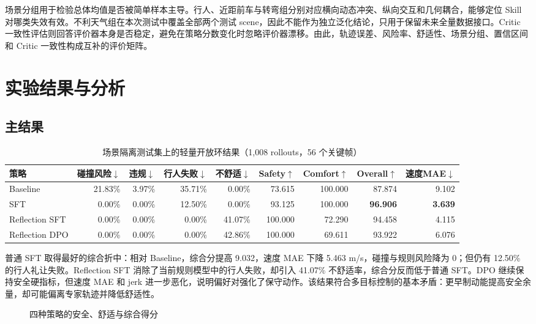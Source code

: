 \documentclass[UTF8,a4paper,12pt,fontset=fandol]{ctexart}
\begin{document}
场景分组用于检验总体均值是否被简单样本主导。行人、近距前车与转弯组分别对应横向动态冲突、纵向交互和几何耦合，能够定位 Skill 对哪类失效有效。不利天气组在本次测试中覆盖全部两个测试 scene，因此不能作为独立泛化结论，只用于保留未来全量数据接口。Critic 一致性评估则回答评价器本身是否稳定，避免在策略分数变化时忽略评价器漂移。由此，轨迹误差、风险率、舒适性、场景分组、置信区间和 Critic 一致性构成互补的评价矩阵。

\section{实验结果与分析}
\subsection{主结果}
\begin{table}[!htbp]
\centering\scriptsize
\caption{场景隔离测试集上的轻量开放环结果（1,008 rollouts，56 个关键帧）}
\begin{tabular}{lrrrrrrrr}
\toprule
策略 & 碰撞风险$\downarrow$ & 违规$\downarrow$ & 行人失败$\downarrow$ & 不舒适$\downarrow$ & Safety$\uparrow$ & Comfort$\uparrow$ & Overall$\uparrow$ & 速度MAE$\downarrow$ \\
\midrule
Baseline & 21.83\% & 3.97\% & 35.71\% & 0.00\% & 73.615 & 100.000 & 87.874 & 9.102 \\
SFT & 0.00\% & 0.00\% & 12.50\% & 0.00\% & 93.125 & 100.000 & \textbf{96.906} & \textbf{3.639} \\
Reflection SFT & 0.00\% & 0.00\% & 0.00\% & 41.07\% & 100.000 & 72.290 & 94.458 & 4.115 \\
Reflection DPO & 0.00\% & 0.00\% & 0.00\% & 42.86\% & 100.000 & 69.611 & 93.922 & 6.076 \\
\bottomrule
\end{tabular}
\end{table}

普通 SFT 取得最好的综合折中：相对 Baseline，综合分提高 9.032，速度 MAE 下降 5.463 m/s，碰撞与规则风险降为 0；但仍有 12.50\% 的行人礼让失败。Reflection SFT 消除了当前规则模型中的行人失败，却引入 41.07\% 不舒适率，综合分反而低于普通 SFT。DPO 继续保持安全硬指标，但速度 MAE 和 jerk 进一步恶化，说明偏好对强化了保守动作。该结果符合多目标控制的基本矛盾：更早制动能提高安全余量，却可能偏离专家轨迹并降低舒适性。

\begin{figure}[!htbp]
\centering
{}
\caption{四种策略的安全、舒适与综合得分}
\end{figure}
\end{document}
